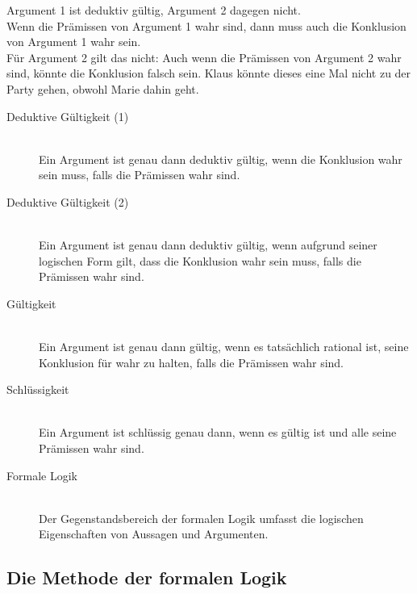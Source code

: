 \documentclass{scrartcl}
\begin{document}
Argument 1 ist deduktiv gültig, Argument 2 dagegen nicht. \\

Wenn die Prämissen von Argument 1 wahr sind, dann muss auch die Konklusion von Argument 1 wahr sein. \\

Für Argument 2 gilt das nicht: Auch wenn die Prämissen von Argument 2 wahr sind, könnte die Konklusion falsch sein. Klaus könnte dieses eine Mal nicht zu der Party gehen, obwohl Marie dahin geht.

\begin{description}
	\item[Deduktive Gültigkeit (1)] \mbox{}\\  Ein Argument ist genau dann deduktiv gültig, wenn die Konklusion wahr sein muss, falls die Prämissen wahr sind.
	\item[Deduktive Gültigkeit (2)] \mbox{}\\ Ein Argument ist genau dann deduktiv gültig, wenn aufgrund seiner logischen Form gilt, dass die Konklusion wahr sein muss, falls die Prämissen wahr sind.
\end{description}

\begin{description}
	\item[Gültigkeit] \mbox{}\\ Ein Argument ist genau dann gültig, wenn es tatsächlich rational ist, seine Konklusion für wahr zu halten, falls die Prämissen wahr sind.
\end{description}

\begin{description}
	\item[Schlüssigkeit] \mbox{}\\ Ein Argument ist schlüssig genau dann, wenn es gültig ist und alle seine Prämissen wahr sind.
\end{description}

\begin{description}
	\item[Formale Logik] \mbox{}\\ Der Gegenstandsbereich der formalen Logik umfasst die logischen Eigenschaften von Aussagen und Argumenten.
\end{description}

\subsection{Die Methode der formalen Logik}
\end{document}
